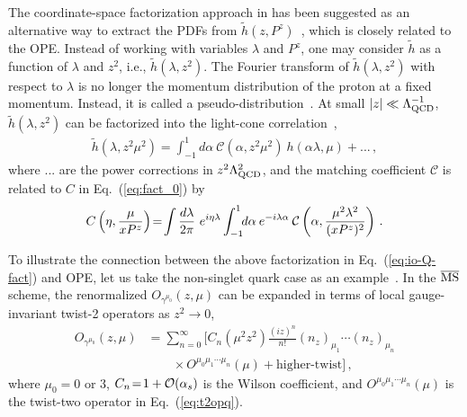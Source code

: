 \documentclass[aps,rmp,reprint,amsmath,amssymb,graphicx,longbibliography]{revtex4-1} %
\newcommand{\MS}{{\overline{\rm MS}}}
\newcommand{\nn}{\nonumber}
\DeclareRobustCommand{\eq}[1]{Eq.~(\ref{eq:#1})}
\begin{document}
The coordinate-space factorization approach in \cite{Braun:1994jq} has been
suggested as an alternative way to extract the PDFs from $\tilde h(z, P^z)$~\cite{Radyushkin:2017cyf,Orginos:2017kos,Radyushkin:2019mye}, which is closely related to the OPE.
Instead of working with variables $\lambda$ and $P^z$,
one may consider $\tilde h$ as a function of $\lambda$ and $z^2$, i.e.,
$\tilde h(\lambda, z^2)$. The Fourier transform
of $\tilde h(\lambda, z^2)$ with respect to $\lambda$ is no longer the momentum
distribution of the proton at a fixed momentum. Instead, it is called a pseudo-distribution~\cite{Radyushkin:2017cyf}.
At small $|z|\ll \Lambda^{-1}_{\rm QCD}$, $\tilde h(\lambda, z^2)$ can be factorized into the light-cone correlation~\cite{Radyushkin:2017lvu,Izubuchi:2018srq},
\begin{align}
	\label{eq:io-Q-fact}
	\tilde{h}(\lambda, z^2\mu^2)
	=\int_{-1}^1 d\alpha\ \mathcal{C}(\alpha, z^2\mu^2)\ h(\alpha\lambda,\mu) +...\,,
\end{align}
where $...$ are the power corrections in $z^2\Lambda^2_{\rm QCD}$,
and the matching coefficient $\mathcal{C}$
is related to $C$ in Eq.~(\ref{eq:fact_0}) by
\begin{align} \label{eq:ftc-C}
	C\left(\eta,{\mu\over xP^z}\right)
	\!= \!\int {d\lambda\over 2\pi}\ e^{i\eta\lambda}\int_{-1}^1\!\! d\alpha\: e^{-i\lambda\alpha}\: \mathcal{C}\left(\alpha,{\mu^2 \lambda^2\over (xP^z)^2}\right)\,.
\end{align}

To illustrate the connection between the above factorization in \eq{io-Q-fact} and OPE,
let us take the non-singlet quark case as an example~\cite{Izubuchi:2018srq,Wang:2019tgg}. In the $\MS$ scheme, the renormalized $O_{\gamma^{\mu_0}}(z,\mu)$ can be expanded in terms of local gauge-invariant twist-2 operators as $z^2\to 0$,
\begin{align}\label{eq:ope-tq}
	O_{\gamma^{\mu_0}}(z,\mu) &=\sum_{n=0}^\infty \Big[C_n ({\mu}^2 z^2)\frac{(iz)^n}{n!} (n_z)_{\mu_1}\cdots (n_z)_{\mu_n} \nn\\
	&\qquad \times O^{\mu_0\mu_1\cdots\mu_n}(\mu) +  \text{higher-twist}\Big]\,,
\end{align}
where $\mu_0\!=\!0$ or $3$, $C_n\!=\!1+{\cal O}(\alpha_s)$ is the Wilson coefficient, and $O^{\mu_0\mu_1\cdots\mu_n}(\mu)$
is the twist-two operator in \eq{t2opq}.
\end{document}
